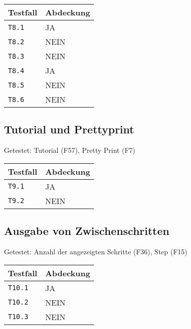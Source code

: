 \documentclass[parskip=full,11pt,twoside]{scrartcl}
\begin{document}
    \label{shortcuts}
    \begin{center}
        \begin{tabular}{ p{9cm} p{4cm}}
            Testfall & Abdeckung \\ \hline
            \texttt{T8.1} & \cellcolor{green!20}JA \\ \hline
            \texttt{T8.2} & \cellcolor{red!20}NEIN \\ \hline
            \texttt{T8.3} & \cellcolor{red!20}NEIN \\ \hline
            \texttt{T8.4} & \cellcolor{green!20}JA \\ \hline
            \texttt{T8.5} & \cellcolor{red!20}NEIN \\ \hline
            \texttt{T8.6} & \cellcolor{red!20}NEIN \\ \hline
        \end{tabular}
    \end{center}

\subsection{Tutorial und Prettyprint}
    Getestet:
    Tutorial (F57),
    Pretty Print (F7)
    
    \label{shortcuts}
    \begin{center}
        \begin{tabular}{ p{9cm} p{4cm}}
            Testfall & Abdeckung \\ \hline
            \texttt{T9.1} & \cellcolor{green!20}JA \\ \hline
            \texttt{T9.2} & \cellcolor{red!20}NEIN \\ \hline
        \end{tabular}
    \end{center}

\subsection{Ausgabe von Zwischenschritten}
    Getestet:
    Anzahl der angezeigten Schritte (F36),
    Step (F15)
    
    \label{shortcuts}
    \begin{center}
        \begin{tabular}{ p{9cm} p{4cm}}
            Testfall & Abdeckung \\ \hline
            \texttt{T10.1} & \cellcolor{green!20}JA \\ \hline
            \texttt{T10.2} & \cellcolor{red!20}NEIN \\ \hline
            \texttt{T10.3} & \cellcolor{red!20}NEIN \\ \hline
        \end{tabular}
    \end{center}
\end{document}
